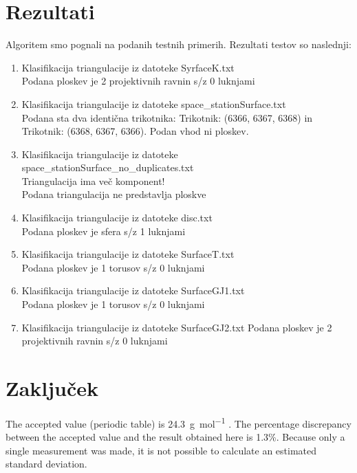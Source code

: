 \documentclass{article}
\begin{document}
\section{Rezultati}
Algoritem smo pognali na podanih testnih primerih. Rezultati testov so naslednji:
\begin{enumerate}
\item Klasifikacija triangulacije iz datoteke SyrfaceK.txt \\
	Podana ploskev je 2 projektivnih ravnin s/z 0 luknjami
\item Klasifikacija triangulacije iz datoteke space\_stationSurface.txt \\
	Podana sta dva identična trikotnika: Trikotnik: (6366, 6367, 6368) in Trikotnik: (6368, 6367, 6366). Podan vhod ni ploskev.
\item Klasifikacija triangulacije iz datoteke space\_stationSurface\_no\_duplicates.txt \\
	Triangulacija ima več komponent! \\
	Podana triangulacija ne predstavlja ploskve
\item Klasifikacija triangulacije iz datoteke disc.txt \\
	Podana ploskev je sfera s/z 1 luknjami
\item Klasifikacija triangulacije iz datoteke SurfaceT.txt \\
	Podana ploskev je 1 torusov s/z 0 luknjami
\item Klasifikacija triangulacije iz datoteke SurfaceGJ1.txt \\
	Podana ploskev je 1 torusov s/z 0 luknjami
\item Klasifikacija triangulacije iz datoteke SurfaceGJ2.txt
	Podana ploskev je 2 projektivnih ravnin s/z 0 luknjami
\end{enumerate}


\section{Zaključek}

The accepted value (periodic table) is \SI{24.3}{\gram\per\mole} \cite{Smith:2012qr}. The percentage discrepancy between the accepted value and the result obtained here is 1.3\%. Because only a single measurement was made, it is not possible to calculate an estimated standard deviation.
\end{document}
